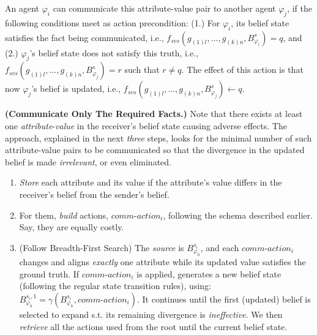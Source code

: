 \documentclass[letterpaper]{article} %
\begin{document}
An agent $\varphi_i$ can communicate this attribute-value pair to another agent $\varphi_j$, if the following conditions meet as action precondition: 
(1.) For $\varphi_i$, its belief state satisfies the fact being communicated, i.e.,
$f_{\textit{svs}}(g_{(1)l},...,g_{(k)n},B_{\varphi_i}^s) = q$, and (2.) $\varphi_j$'s belief state does not satisfy this truth, i.e., $f_{\textit{svs}}(g_{(1)l},...,g_{(k)n},B_{\varphi_j}^s) = r$ such that $r \neq q$.
The effect of this action is that now 
$\varphi_j$'s belief is updated, i.e., $f_{\textit{svs}}(g_{(1)l},...,g_{(k)n},B_{\varphi_j}^s) \leftarrow q$. 


\textbf{(Communicate Only The Required Facts.)}
Note that there exists at least one \textit{attribute}-\textit{value} in the receiver's belief state causing adverse effects. 
The approach, explained in the next \textit{three} steps, looks for the minimal number of such attribute-value pairs to be communicated so that
the divergence in the updated belief is made \textit{irrelevant}, or even eliminated.
\begin{enumerate}
    \item 
    \textit{Store} each attribute and its value if the attribute's value differs in the receiver's belief from the sender's belief. 

    \item For them, \textit{build} actions, $\textit{comm-action}_i$, following the schema described earlier. Say, they are equally costly.  
    
    \item 
    (Follow Breadth-First Search) 
    The \textit{source} is $B_{\varphi_h}^{s_i}$, and each $\textit{comm-action}_i$ changes and aligns \textit{exactly} one attribute while its updated value satisfies the ground truth. If $\textit{comm-action}_i$ is applied, generates a new belief state (following the regular state transition rules), using: $B_{\varphi_h}^{s_i,1} = \gamma(B_{\varphi_h}^{s_i}, \textit{comm-action}_i)$.
    It continues until the first (updated) belief is selected to expand s.t. its remaining divergence is \textit{ineffective}. We then \textit{retrieve} all the actions used from the root until the current belief state.   
\end{enumerate}
\end{document}
